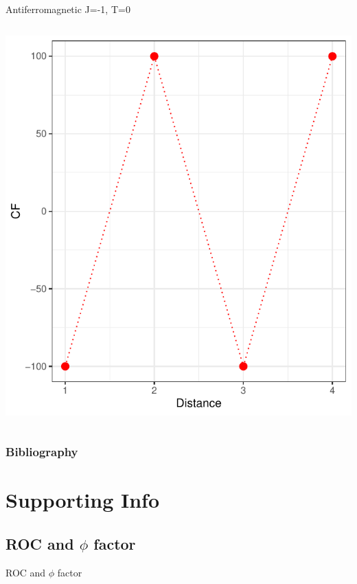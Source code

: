 \documentclass{beamer}
\begin{document}
\begin{frame}{Antiferromagnetic J=-1, T=0}
\begin{columns}
\begin{column}{0.5\textwidth}
\begin{center}
     \includegraphics[width=\textwidth]{Pic/J-1_10_6000_T=0_CORRELATION.pdf}
     \end{center}
\end{column}
\end{columns}
\end{frame}



\begin{frame}[t,allowframebreaks]
\frametitle{Bibliography}
\printbibliography
\end{frame}


\section{Supporting Info}

\subsection{ROC and $\phi$ factor}
\begin{frame}{}
\begin{center}
{\Huge ROC and $\phi$ factor}
\end{center}
\end{frame}
\end{document}

